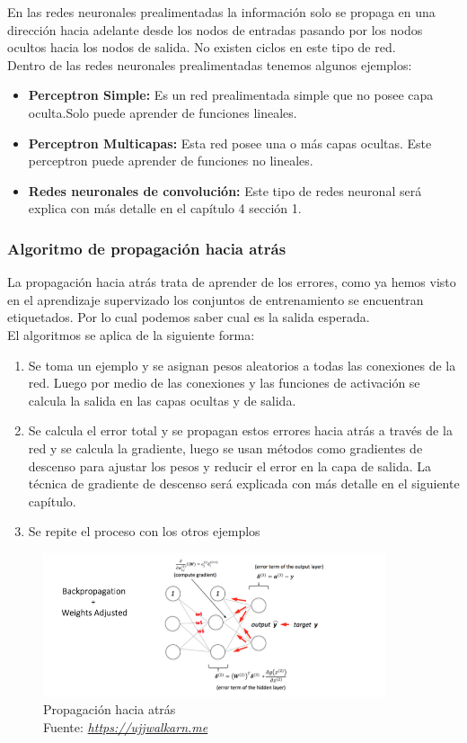 En las redes neuronales prealimentadas la información solo se propaga en una dirección hacia adelante desde los nodos de entradas pasando por los nodos ocultos hacia los nodos de salida. No existen ciclos en este tipo de red.\\
Dentro de las redes neuronales prealimentadas tenemos algunos ejemplos:
\begin{itemize}
	\item \textbf{Perceptron Simple:} Es un red prealimentada simple que no posee capa oculta.Solo puede aprender de funciones lineales.
	\item \textbf{Perceptron Multicapas:} Esta red posee una o más capas ocultas. Este perceptron puede aprender de funciones no lineales.
	\item \textbf{Redes neuronales de convolución:} Este tipo de redes neuronal será explica con más detalle en el capítulo 4 sección 1.
\end{itemize}
\subsubsection{Algoritmo de propagación hacia atrás}
La propagación hacia atrás trata de aprender de los errores, como ya hemos visto en el aprendizaje supervizado los conjuntos de entrenamiento se encuentran etiquetados. Por lo cual podemos saber cual es la salida esperada. \\
El algoritmos se aplica de la siguiente forma:

\begin{enumerate}
	\item Se toma un ejemplo y se asignan pesos aleatorios a todas las conexiones de la red. Luego por medio de las conexiones y las funciones de activación se calcula la salida en las capas ocultas y de salida.
	\item Se calcula el error total y se propagan estos errores hacia atrás a través de la red y se calcula la gradiente, luego se usan métodos como gradientes de descenso para ajustar los pesos y reducir el error en la capa de salida. La técnica de gradiente de descenso será explicada con más detalle en el siguiente capítulo.
	\item Se repite el proceso con los otros ejemplos
\end{enumerate}
\begin{figure}[H]
	\centering
	\includegraphics[width=0.9\textwidth]{Figures/backp.png}
	\caption{Propagación hacia atrás \\ Fuente:  \href{https://ujjwalkarn.me/2016/08/09/quick-intro-neural-networks/}{\textit{https://ujjwalkarn.me}}}
	\label{backpropagation}
\end{figure} 
